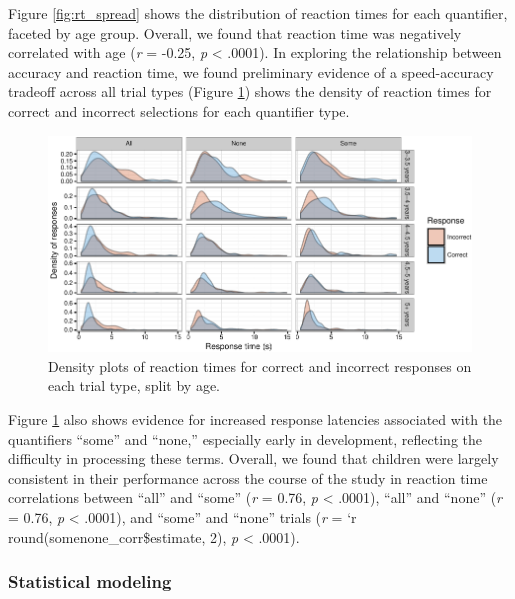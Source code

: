 \documentclass[10pt, letterpaper]{article}
\newenvironment{CodeChunk}{}{}
\begin{document}
Figure \ref{fig:rt_spread} shows the distribution of reaction times for
each quantifier, faceted by age group. Overall, we found that reaction
time was negatively correlated with age (\emph{r} = -0.25, \emph{p}
\textless{} .0001). In exploring the relationship between accuracy and
reaction time, we found preliminary evidence of a speed-accuracy
tradeoff across all trial types (Figure \ref{fig:density}) shows the
density of reaction times for correct and incorrect selections for each
quantifier type.

\begin{CodeChunk}
\begin{figure}[t]

{\centering \includegraphics{figs/density-1} 

}

\caption[Density plots of reaction times for correct and incorrect responses on each trial type, split by age]{Density plots of reaction times for correct and incorrect responses on each trial type, split by age.}\label{fig:density}
\end{figure}
\end{CodeChunk}

Figure \ref{fig:density} also shows evidence for increased response
latencies associated with the quantifiers ``some'' and ``none,''
especially early in development, reflecting the difficulty in processing
these terms. Overall, we found that children were largely consistent in
their performance across the course of the study in reaction time
correlations between ``all'' and ``some'' (\emph{r} = 0.76, \emph{p}
\textless{} .0001), ``all'' and ``none'' (\emph{r} = 0.76, \emph{p}
\textless{} .0001), and ``some'' and ``none'' trials (\emph{r} = `r
round(somenone\_corr\$estimate, 2), \emph{p} \textless{} .0001).

\subsubsection{Statistical modeling}\label{statistical-modeling-1}
\end{document}
